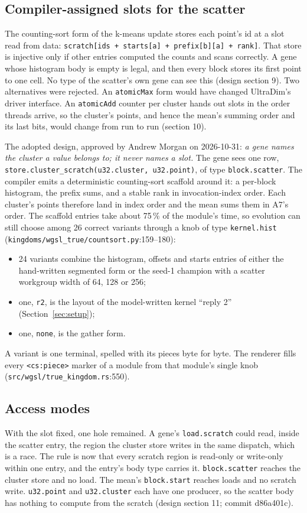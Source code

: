 \documentclass[sigconf,nonacm]{acmart}
\newcommand{\code}[1]{\nolinkurl{#1}}
\newcommand{\src}[1]{{\footnotesize\nolinkurl{#1}}}
\begin{document}
\subsection{Compiler-assigned slots for the scatter}
\label{sec:scatter}
The counting-sort form of the k-means update stores each point's id at a slot
read from data: \code{scratch[ids + starts[a] + prefix[b][a] + rank]}. That
store is injective only if other entries computed the counts and scans
correctly. A gene whose histogram body is empty is legal, and then every block
stores its first point to one cell. No type of the scatter's own gene can see
this (design section 9). Two alternatives were rejected. An \code{atomicMax}
form would have changed UltraDim's driver interface. An \code{atomicAdd}
counter per cluster hands out slots in the order threads arrive, so the
cluster's points, and hence the mean's summing order and its last bits, would
change from run to run (section 10).

The adopted design, approved by Andrew Morgan on 2026-10-31: \emph{a gene names
the cluster a value belongs to; it never names a slot.} The gene sees one row,
\code{store.cluster_scratch(u32.cluster, u32.point)}, of type
\code{block.scatter}. The compiler emits a deterministic counting-sort scaffold
around it: a per-block histogram, the prefix sums, and a stable rank in
invocation-index order. Each cluster's points therefore land in index order and
the mean sums them in A7's order. The scaffold entries take about 75\,\% of the
module's time, so evolution can still choose among 26 correct variants through
a knob of type \code{kernel.hist}
(\src{kingdoms/wgsl_true/countsort.py}:159--180):
\begin{itemize}
\item 24 variants combine the histogram, offsets and starts entries of either
  the hand-written segmented form or the seed-1 champion with a scatter
  workgroup width of 64, 128 or 256;
\item one, \code{r2}, is the layout of the model-written kernel ``reply 2''
  (Section~\ref{sec:setup});
\item one, \code{none}, is the gather form.
\end{itemize}
A variant is one terminal, spelled with its pieces byte for byte. The renderer
fills every \code{<cs:piece>} marker of a module from that module's single
knob (\src{src/wgsl/true_kingdom.rs}:550).

\subsection{Access modes}
With the slot fixed, one hole remained. A gene's \code{load.scratch} could read,
inside the scatter entry, the region the cluster store writes in the same
dispatch, which is a race. The rule is now that every scratch region is
read-only or write-only within one entry, and the entry's body type carries
it. \code{block.scatter} reaches the cluster store and no load. The mean's
\code{block.start} reaches loads and no scratch write. \code{u32.point} and
\code{u32.cluster} each have one producer, so the scatter body has nothing to
compute from the scratch (design section 11; commit d86a401c).
\end{document}
